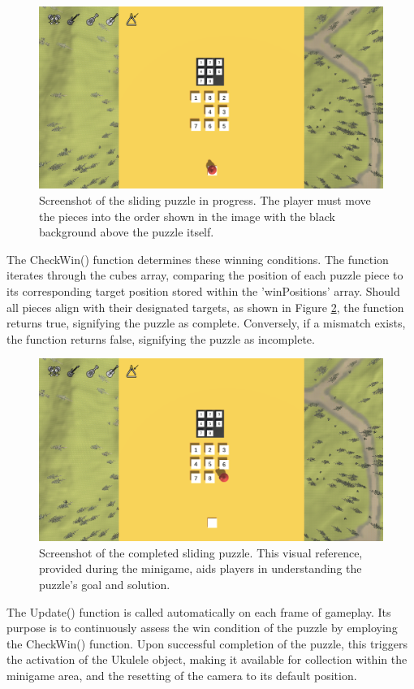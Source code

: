 \documentclass{l4proj}
\begin{document}
\begin{figure}[h]
  \centering
  \includegraphics[width=0.7\linewidth]{dissertation/images/Sliding_Incomplete.png} 
  \caption{Screenshot of the sliding puzzle in progress. The player must move the pieces into the order shown in the image with the black background above the puzzle itself.} 
  \label{fig:puzzle_incomplete} 
\end{figure}

The CheckWin() function determines these winning conditions. The function iterates through the cubes array, comparing the position of each puzzle piece to its corresponding target position stored within the 'winPositions' array. Should all pieces align with their designated targets, as shown in Figure \ref{fig:puzzle_complete}, the function returns true, signifying the puzzle as complete. Conversely, if a mismatch exists, the function returns false, signifying the puzzle as incomplete.

\begin{figure}[h]
  \centering
  \includegraphics[width=0.7\linewidth]{dissertation/images/Sliding_Complete.png} 
  \caption{Screenshot of the completed sliding puzzle. This visual reference, provided during the minigame, aids players in understanding the puzzle's goal and solution.} 
  \label{fig:puzzle_complete} 
\end{figure}

The Update() function is called automatically on each frame of gameplay. Its purpose is to continuously assess the win condition of the puzzle by employing the CheckWin() function. Upon successful completion of the puzzle, this triggers the activation of the Ukulele object, making it available for collection within the minigame area, and the resetting of the camera to its default position.
\end{document}
